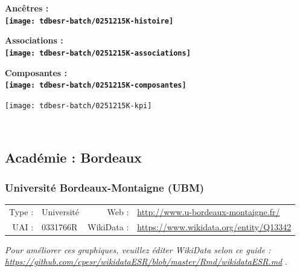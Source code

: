 \documentclass[12pt,french,]{article}
\begin{document}
\vspace{1cm}  
\begin{minipage}[b]{0.50\textwidth}\begin{center} \bf Ancêtres : \\  
\texttt{[image: tdbesr-batch/0251215K-histoire]} \end{center}\end{minipage}\begin{minipage}[b]{0.50\textwidth}\begin{center} \bf Associations : \\  
\texttt{[image: tdbesr-batch/0251215K-associations]} \end{center}\end{minipage}

\hrulefill

\begin{center} \bf Composantes : \\  
\texttt{[image: tdbesr-batch/0251215K-composantes]} \end{center}

\begin{center}\texttt{[image: tdbesr-batch/0251215K-kpi]} \end{center}\checkoddpage

\ifoddpage \fi ~\newpage  

\hypertarget{acaduxe9mie-bordeaux}{%
\subsection{Académie : Bordeaux}\label{acaduxe9mie-bordeaux}}

\hypertarget{universituxe9-bordeaux-montaigne-ubm}{%
\subsubsection{Université Bordeaux-Montaigne
(UBM)}\label{universituxe9-bordeaux-montaigne-ubm}}

\begin{tabular*}{\textwidth}{rp{5cm}rl}  
\hline  
Type : & Université & Web : &\href{http://www.u-bordeaux-montaigne.fr/}{http://www.u-bordeaux-montaigne.fr/} \\  
UAI : & 0331766R & WikiData : & \href{https://www.wikidata.org/entity/Q13342}{https://www.wikidata.org/entity/Q13342} \\  
\hline  
\end{tabular*}

\textit{\scriptsize Pour améliorer ces graphiques, veuillez éditer WikiData selon ce guide :  \href{https://github.com/cpesr/wikidataESR/blob/master/Rmd/wikidataESR.md}{https://github.com/cpesr/wikidataESR/blob/master/Rmd/wikidataESR.md}}
.
\end{document}
